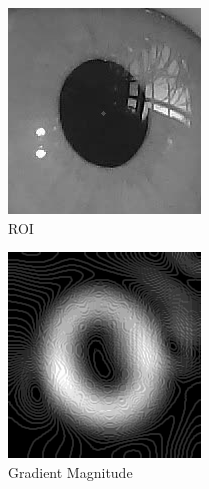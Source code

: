 \begin{figure}[h]
    \centering
    \begin{subfigure}{0.5\textwidth}
        \centering
        \includegraphics[width=0.7\linewidth]{plots/eye_dataset/roi.png}
        \caption{ROI}
    \end{subfigure}%
    \hfill
    \begin{subfigure}{0.5\textwidth}
        \centering
        \includegraphics[width=0.7\linewidth]{plots/eye_dataset/mag.png}
        \caption{Gradient Magnitude}
    \end{subfigure}%
    \hfill
    \begin{subfigure}{0.5\textwidth}
        \centering

\end{subfigure}
\end{figure}
